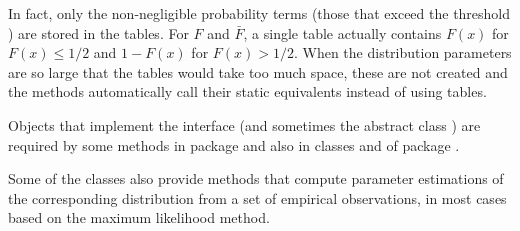 In fact, only the non-negligible probability terms 
(those that exceed the threshold
) 
are stored in the tables.  For $F$ and $\bar{F}$, a single table actually
contains $F (x)$ for $F (x) \le 1/2$ and $1-F (x)$ for $F (x) > 1/2$.
When the distribution parameters are so large that the tables would
take too much space, these are not created and the methods
automatically call their static equivalents instead of using tables.

Objects that implement the interface
(and sometimes the abstract class
) 
are required by some methods in 
package 
and also in classes
 and
 of
 package .


Some of the classes also provide methods that compute parameter estimations
of the corresponding distribution from a set of empirical observations, 
in most cases based on the maximum likelihood method.

